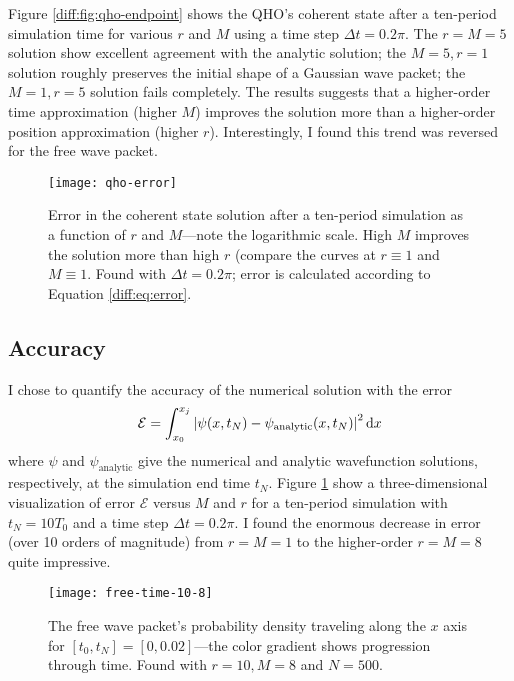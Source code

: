 \documentclass[11pt, a4paper]{article}
\newcommand{\diff}{\mathop{}\!\mathrm{d}} %
\begin{document}
Figure \ref{diff:fig:qho-endpoint} shows the QHO's coherent state after a ten-period simulation time for various $ r $ and $ M $ using a time step $ \Delta t = 0.2 \pi $. The $ r = M = 5 $ solution show excellent agreement with the analytic solution; the $ M = 5, r = 1 $ solution roughly preserves the initial shape of a Gaussian wave packet; the $ M = 1, r = 5 $ solution fails completely. The results suggests that a higher-order time approximation (higher $ M $) improves the solution more than a higher-order position approximation (higher $ r $). Interestingly, I found this trend was reversed for the free wave packet.


\begin{figure}[htb!]
\centering
\texttt{[image: qho-error]}
\caption{Error in the coherent state solution after a ten-period simulation as a function of $ r $ and $ M $---note the logarithmic scale. High $ M $ improves the solution more than high $ r $ (compare the curves at $ r \equiv 1$ and $ M \equiv 1 $. Found with $ \Delta t = 0.2\pi $; error is calculated according to Equation \ref{diff:eq:error}.}
\label{diff:fig:qho-error}
\end{figure}

\subsection{Accuracy}
I chose to quantify the accuracy of the numerical solution with the error
\begin{equation}
	\mathcal{E} = \int_{x_{0}}^{x_{j}} \abs{\psi(x, t_{N}) - \psi_{\text{analytic}}(x, t_{N})}^{2} \diff x \label{diff:eq:error}
\end{equation}
where $ \psi $ and $ \psi_{\text{analytic}} $ give the numerical and analytic wavefunction solutions, respectively, at the simulation end time $ t_{N} $. Figure \ref{diff:fig:qho-error} show a three-dimensional visualization of error $ \mathcal{E} $ versus $ M $ and $ r $ for a ten-period simulation with $ t_{N} = 10 T_{0} $ and a time step $ \Delta t = 0.2 \pi $. I found the enormous decrease in error (over 10 orders of magnitude) from $ r = M = 1 $ to the higher-order $ r = M = 8 $ quite impressive.



\begin{figure}[htb!]
\centering
\texttt{[image: free-time-10-8]}
\caption{The free wave packet's probability density traveling along the $ x $ axis for $ [t_{0}, t_{N}] = [0, 0.02] $---the color gradient shows progression through time. Found with $ r = 10, M = 8 $ and $ N = 500 $.}
\label{diff:fig:free-time}
\end{figure}
\end{document}
